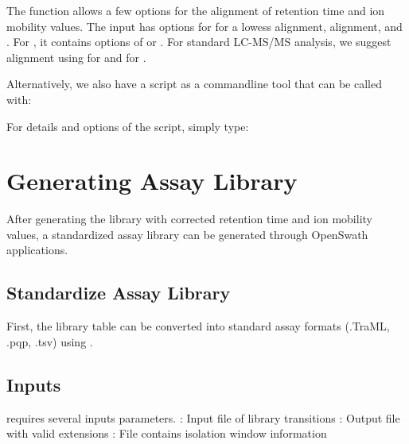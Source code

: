\documentclass[letterpaper,10pt,english]{sphinxmanual}
\begin{document}
The function allows a few options for the alignment of retention time and ion
mobility values. The input  has options for  for a
lowess alignment,  alignment, and . For , it
contains options of  or . For standard LC-MS/MS analysis, we
suggest alignment using  for  and  for
.

Alternatively, we also have a script as a commandline tool that can be called with:

\begin{sphinxVerbatim}[commandchars=\\\{\}]
 
\end{sphinxVerbatim}

For details and options of the script, simply type:

\begin{sphinxVerbatim}[commandchars=\\\{\}]
  
\end{sphinxVerbatim}


\section{Generating Assay Library}
\label{\detokenize{librarygeneration:generating-assay-library}}
After generating the library with corrected retention time and ion mobility values,
a standardized assay library can be generated through OpenSwath applications.


\subsection{Standardize Assay Library}
\label{\detokenize{librarygeneration:standardize-assay-library}}
First, the library table can be converted into standard assay formats (.TraML, .pqp, .tsv)
using .


\subsection{Inputs}
\label{\detokenize{librarygeneration:inputs}}
 requires several inputs parameters.
\textendash{}  : Input file of library transitions
\textendash{} : Output file with valid extensions
\textendash{} : File contains isolation window information
\end{document}
